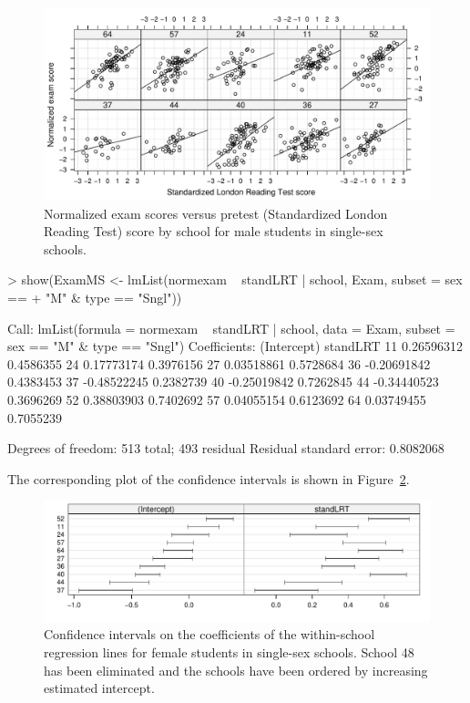 \documentclass[12pt]{article}
\begin{document}
\begin{figure}[tbp]
  \centering
  \includegraphics[width=\textwidth]{figs/SoftRev-Examplot5}
  \caption{Normalized exam scores versus pretest (Standardized London
    Reading Test) score by school for male students in single-sex
    schools.}
  \label{fig:Examplot5}
\end{figure}

\begin{Schunk}
\begin{Sinput}
> show(ExamMS <- lmList(normexam ~ standLRT | school, Exam, subset = sex == 
+     "M" & type == "Sngl"))
\end{Sinput}
\begin{Soutput}
Call: lmList(formula = normexam ~ standLRT | school, data = Exam, subset = sex ==      "M" & type == "Sngl") 
Coefficients:
   (Intercept)  standLRT
11  0.26596312 0.4586355
24  0.17773174 0.3976156
27  0.03518861 0.5728684
36 -0.20691842 0.4383453
37 -0.48522245 0.2382739
40 -0.25019842 0.7262845
44 -0.34440523 0.3696269
52  0.38803903 0.7402692
57  0.04055154 0.6123692
64  0.03749455 0.7055239

Degrees of freedom: 513 total; 493 residual
Residual standard error: 0.8082068
\end{Soutput}
\end{Schunk}
The corresponding plot of the confidence intervals is shown in
Figure~\ref{fig:Examplot5b}.
\begin{figure}[tbp]
  \centering
  \includegraphics[width=\textwidth]{figs/SoftRev-Examplot5b}
  \caption{Confidence intervals on the coefficients of the
    within-school regression lines for female students in single-sex
    schools. School 48 has been eliminated and the schools have been
    ordered by increasing estimated intercept.}
  \label{fig:Examplot5b}
\end{figure}
\end{document}
